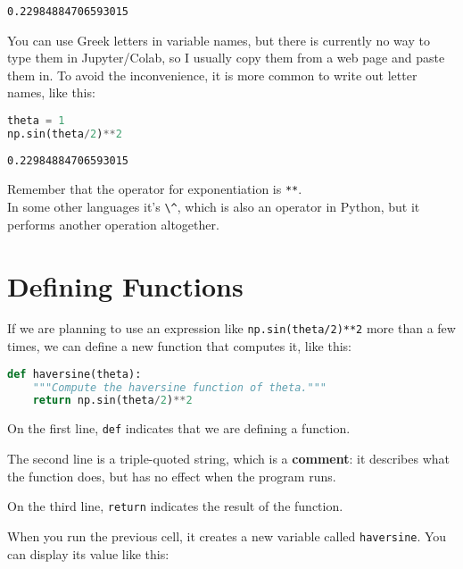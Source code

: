 \begin{lstlisting}[style=output]
0.22984884706593015
\end{lstlisting}

You can use Greek letters in variable names, but there is currently no
way to type them in Jupyter/Colab, so I usually copy them from a web
page and paste them in. To avoid the inconvenience, it is more common to
write out letter names, like this:

\begin{lstlisting}[language=Python,style=source]
theta = 1
np.sin(theta/2)**2
\end{lstlisting}

\begin{lstlisting}[style=output]
0.22984884706593015
\end{lstlisting}

Remember that the operator for exponentiation is
\passthrough{\lstinline!**!}.\\
In some other languages it's \passthrough{\lstinline!\^!}, which is also
an operator in Python, but it performs another operation altogether.

\hypertarget{defining-functions}{%
\section{Defining Functions}\label{defining-functions}}

If we are planning to use an expression like
\passthrough{\lstinline!np.sin(theta/2)**2!} more than a few times, we
can define a new function that computes it, like this:

\begin{lstlisting}[language=Python,style=source]
def haversine(theta):
    """Compute the haversine function of theta."""
    return np.sin(theta/2)**2
\end{lstlisting}

On the first line, \passthrough{\lstinline!def!} indicates that we are
defining a function.

The second line is a triple-quoted string, which is a \textbf{comment}:
it describes what the function does, but has no effect when the program
runs.

On the third line, \passthrough{\lstinline!return!} indicates the result
of the function.

When you run the previous cell, it creates a new variable called
\passthrough{\lstinline!haversine!}. You can display its value like
this:


